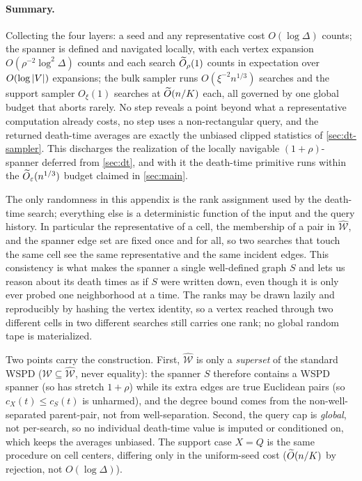 \paragraph{Summary.}
Collecting the four layers: a seed and any representative cost $O(\log\Delta)$ counts; the spanner is
defined and navigated locally, with each vertex expansion $O(\rho^{-2}\log^2\Delta)$ counts and each
search $\widetilde{O}_\rho(1)$ counts in expectation over $O(\log\left|V\right|)$ expansions; the bulk sampler runs
$O(\xi^{-2}n^{1/3})$ searches and the support sampler $O_\xi(1)$ searches at $\widetilde{O}(n/K)$ each, all
governed by one global budget that aborts rarely. No step reveals a point beyond what a representative
computation already costs, no step uses a non-rectangular query, and the returned death-time averages are
exactly the unbiased clipped statistics of \cref{sec:dt-sampler}. This discharges the realization of the
locally navigable $(1+\rho)$-spanner deferred from \cref{sec:dt}, and with it the death-time primitive
runs within the $\widetilde{O}_\varepsilon(n^{1/3})$ budget claimed in \cref{sec:main}.

\begin{remark}\label{rem:wspd-det}
The only randomness in this appendix is the rank assignment used by the death-time search; everything else
is a deterministic function of the input and the query history. In particular the representative of a cell,
the membership of a pair in $\widehat{\mathcal W}$, and the spanner edge set are fixed once and for all, so two searches
that touch the same cell see the same representative and the same incident edges. This consistency is what
makes the spanner a single well-defined graph $S$ and lets us reason about its death times as if $S$ were
written down, even though it is only ever probed one neighborhood at a time. The ranks may be drawn lazily
and reproducibly by hashing the vertex identity, so a vertex reached through two different cells in two
different searches still carries one rank; no global random tape is materialized.
\end{remark}

\begin{remark}\label{rem:verify}
Two points carry the construction. First, $\widehat{\mathcal W}$ is only a \emph{superset} of the standard
WSPD ($\mathcal W\subseteq\widehat{\mathcal W}$, never equality): the spanner $S$ therefore contains a WSPD
spanner (so has stretch $1+\rho$) while its extra edges are true Euclidean pairs (so $c_X(t)\le c_S(t)$ is
unharmed), and the degree bound comes from the non-well-separated parent-pair, not from well-separation.
Second, the query cap is \emph{global}, not per-search, so no individual death-time value is imputed or
conditioned on, which keeps the averages unbiased. The support case $X=Q$ is the same procedure on cell
centers, differing only in the uniform-seed cost ($\widetilde{O}(n/K)$ by rejection, not $O(\log\Delta)$).
\end{remark}

